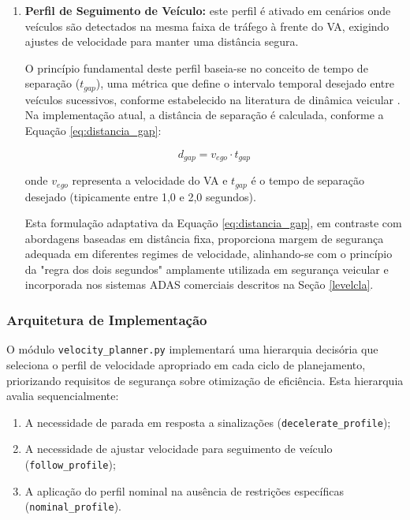 \begin{enumerate}
    \item \textbf{Perfil de Seguimento de Veículo:} este perfil é ativado em cenários onde veículos são detectados na mesma faixa de tráfego à frente do VA, exigindo ajustes de velocidade para manter uma distância segura.
    
    O princípio fundamental deste perfil baseia-se no conceito de tempo de separação ($t_{gap}$), uma métrica que define o intervalo temporal desejado entre veículos sucessivos, conforme estabelecido na literatura de dinâmica veicular \cite{wei2014behavioral}. Na implementação atual, a distância de separação é calculada, conforme a Equação \ref{eq:distancia_gap}:
    
    \begin{equation}\label{eq:distancia_gap}
    d_{gap} = v_{ego} \cdot t_{gap}
    \end{equation}
    
    onde $v_{ego}$ representa a velocidade do VA e $t_{gap}$ é o tempo de separação desejado (tipicamente entre 1,0 e 2,0 segundos).
    
    Esta formulação adaptativa da Equação \ref{eq:distancia_gap}, em contraste com abordagens baseadas em distância fixa, proporciona margem de segurança adequada em diferentes regimes de velocidade, alinhando-se com o princípio da "regra dos dois segundos" amplamente utilizada em segurança veicular e incorporada nos sistemas ADAS comerciais descritos na Seção \ref{levelcla}.
\end{enumerate}

\subsubsection{Arquitetura de Implementação}\label{subsubsec:arquitetura_implementacao_velocidade}

O módulo \texttt{velocity\_planner.py} implementará uma hierarquia decisória que seleciona o perfil de velocidade apropriado em cada ciclo de planejamento, priorizando requisitos de segurança sobre otimização de eficiência. Esta hierarquia avalia sequencialmente:

\begin{enumerate}
    \item A necessidade de parada em resposta a sinalizações (\texttt{decelerate\_profile});
    \item A necessidade de ajustar velocidade para seguimento de veículo (\texttt{follow\_profile});
    \item A aplicação do perfil nominal na ausência de restrições específicas (\texttt{nominal\_profile}).
\end{enumerate}

